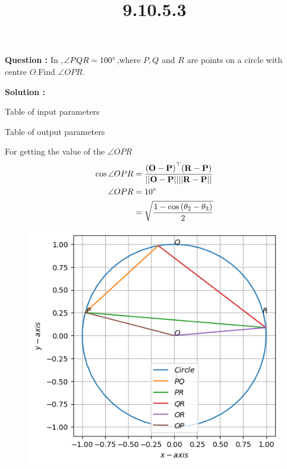 \documentclass[12pt]{article}
\let\vec\mathbf
\providecommand{\brak}[1]{\ensuremath{\left(#1\right)}}
\providecommand{\norm}[1]{\ensuremath{\lvert|#1\rvert|}}
\begin{document}
\title{\textbf{9.10.5.3}}
\date{}
\maketitle
\textbf{Question :} In  ,$\angle PQR = 100\degree$,where $P,Q$ and $R$ are points on a circle with centre $O$.Find $\angle OPR$.

\textbf{Solution :}
\begin{table}[H]
    \centering
    
    \caption{Table of input parameters}
    \label{tab:tab:1}
\end{table}

\begin{table}[H]
    \centering
    
    \caption{Table of output parameters}
    \label{tab:tab:2}
\end{table}
For getting the value of the $\angle OPR$
\begin{align}
    \cos{\angle OPR }&= \frac{\vec{\brak{O-P}}^{\top}\vec{\brak{R-P}}}{\vec{\norm{O-P}\norm{R-P}}}\\
    \angle OPR &= 10\degree\\
	&=\sqrt{\frac{1-\cos{\brak{\theta_2-\theta_3}}}{2}}\\
  \end{align}

  \begin{figure}[H]                                 
	  \centering                          
	  \includegraphics[width=\columnwidth]{fig/9.10.5.3.png}
\caption{}
\label{9.10.5.3}                        
  \end{figure}
\end{document}
